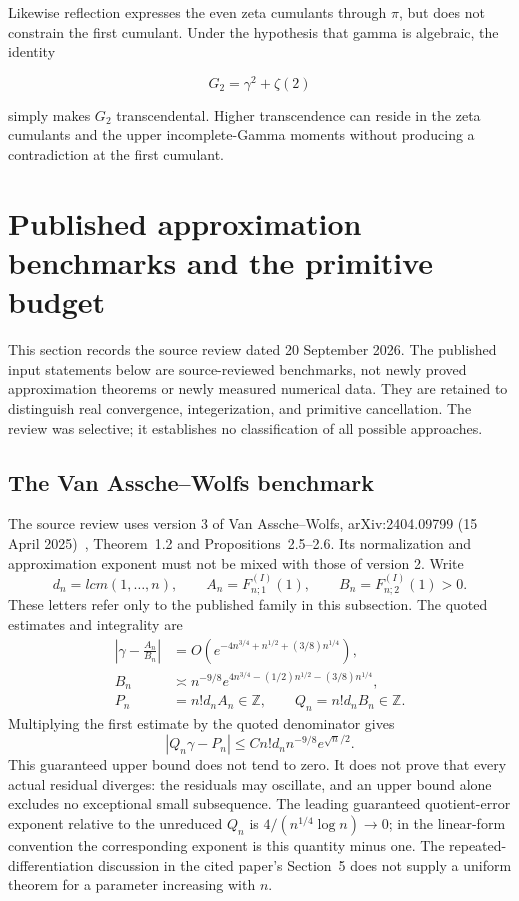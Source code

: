 \documentclass[11pt,a4paper]{article}
\theoremstyle{definition}
\theoremstyle{remark}
\theoremstyle{plain}
\numberwithin{equation}{section}
\def\operatorname#1{#1}\def\mathrm#1{#1}}
\begin{document}
Likewise reflection expresses the even zeta cumulants through \(\pi\),
but does not constrain the first cumulant. Under the hypothesis that
gamma is algebraic, the identity

\[
G_2=\gamma^2+\zeta(2)
\]

simply makes \(G_2\) transcendental. Higher transcendence can reside in
the zeta cumulants and the upper incomplete-Gamma moments without
producing a contradiction at the first cumulant.

\section{Published approximation benchmarks and the primitive budget}
\label{sc:literature:benchmarks}

This section records the source review dated 20 September 2026. The
published input statements below are source-reviewed benchmarks, not
newly proved approximation theorems or newly measured numerical data.
They are retained to distinguish real convergence, integerization, and
primitive cancellation. The review was selective; it establishes no
classification of all possible approaches.

\subsection{The Van Assche--Wolfs benchmark}

The source review uses version 3 of Van Assche--Wolfs,
arXiv:2404.09799 (15 April 2025)~\cite{sc:VW}, Theorem~1.2 and
Propositions~2.5--2.6. Its normalization and approximation exponent
must not be mixed with those of version 2. Write
\[
d_n=\operatorname{lcm}(1,\ldots,n),\qquad
A_n=F^{(I)}_{n;1}(1),\qquad B_n=F^{(I)}_{n;2}(1)>0.
\]
These letters refer only to the published family in this subsection.
The quoted estimates and integrality are
\begin{align*}
\left|\gamma-\frac{A_n}{B_n}\right|
 &=O\!\left(e^{-4n^{3/4}+n^{1/2}+(3/8)n^{1/4}}\right),\\
B_n&\asymp n^{-9/8}
 e^{4n^{3/4}-(1/2)n^{1/2}-(3/8)n^{1/4}},\\
P_n&=n!d_nA_n\in\mathbb Z,\qquad
Q_n=n!d_nB_n\in\mathbb Z.
\end{align*}
Multiplying the first estimate by the quoted denominator gives
\begin{equation}\label{sc:literature:vw-error}
|Q_n\gamma-P_n|
\le Cn!d_n n^{-9/8}e^{\sqrt n/2}.
\end{equation}
This guaranteed upper bound does not tend to zero. It does not prove
that every actual residual diverges: the residuals may oscillate, and
an upper bound alone excludes no exceptional small subsequence.
The leading guaranteed quotient-error exponent relative to the
unreduced $Q_n$ is
$4/(n^{1/4}\log n)\to0$; in the linear-form convention the
corresponding exponent is this quantity minus one.
The repeated-differentiation discussion in the cited paper's
Section~5 does not supply a uniform theorem for a parameter increasing
with $n$.
\end{document}
